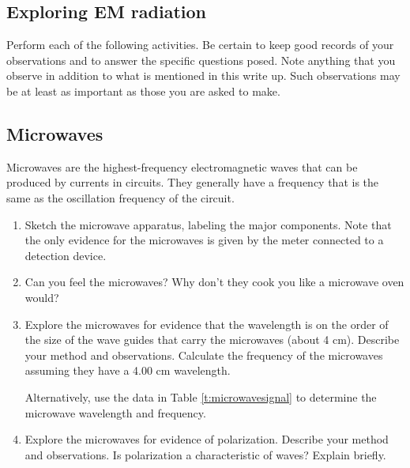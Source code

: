 \begin{multicols}{2}
\section{Exploring EM radiation}
Perform each of the following activities.  Be certain to keep good records of your observations and to answer the specific questions posed.  Note anything that you observe in addition to what is mentioned in this write up.  Such observations may be at least as important as those you are asked to make.

\subsection{Microwaves}
Microwaves are the highest-frequency electromagnetic waves that can be produced by currents in circuits.  They generally have a frequency that is the same as the oscillation frequency of the circuit.

\begin{enumerate}
	\item Sketch the microwave apparatus, labeling the major components.  Note that the only evidence for the microwaves is given by the meter connected to a detection device.
	\item Can you feel the microwaves?  Why don't they cook you like a microwave oven would?
	\item Explore the microwaves for evidence that the wavelength is on the order of the size of the wave guides that carry the microwaves (about 4 cm).  Describe your method and observations.  Calculate the frequency of the microwaves assuming they have a 4.00 cm wavelength. \par
	Alternatively, use the data in Table \ref{t:microwavesignal} to determine the microwave wavelength and frequency.
	\item Explore the microwaves for evidence of polarization.  Describe your method and observations.  Is polarization a characteristic of waves?  Explain briefly.
\end{enumerate}
	

\end{multicols}
